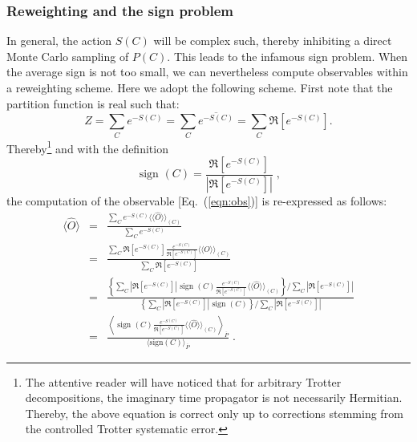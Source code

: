 \subsubsection{Reweighting and the sign problem}\label{sec:reweight}

In general, the action  $S(C) $ will be complex such, thereby inhibiting a direct Monte Carlo sampling of $P(C)$.   This leads to the infamous sign problem.  When the average sign is not too small, we can nevertheless  compute observables within a reweighting scheme.   Here we adopt the following scheme. First  note  that the partition function is real such that: 
\begin{equation}
	Z =   \sum_{C}  e^{-S(C)}    =  \sum_{C}  \overline{e^{-S(C)}} = \sum_{C}  \Re \left[e^{-S(C)} \right]. 
\end{equation}
Thereby\footnote{The attentive reader will have noticed that   for arbitrary Trotter decompositions,  the  imaginary time propagator is not necessarily Hermitian. Thereby, the above equation is correct only up to corrections stemming from the  controlled Trotter systematic error. }
and with the definition
\begin{equation}
\label{Sign.eq}
	 \text{ sign }(C)   =  \frac{   \Re \left[e^{-S(C)} \right]  } {\left| \Re \left[e^{-S(C)} \right]  \right|  }\;,
\end{equation}
the computation of the observable [Eq.~(\ref{eqn:obs})] is re-expressed as follows:
\begin{eqnarray}\label{eqn:obs_rw}
\langle \hat{O}  \rangle  &=&  \frac{\sum_{C}  e^{-S(C)} \langle \langle \hat{O}  \rangle \rangle_{(C)} }{\sum_{C}  e^{-S(C)}}       \nonumber \\ 
                          &=&  \frac{\sum_{C}   \Re \left[e^{-S(C)} \right]    \frac{e^{-S(C)}} {\Re \left[e^{-S(C)} \right]}  \langle \langle \hat{O}  \rangle \rangle_{(C)} }{\sum_{C}   \Re \left[e^{-S(C)} \right]}    \nonumber \\ 
          &=&
   \frac{
     \left\{
      \sum_{C}  \left| \Re \left[e^{-S(C)} \right]  \right|   \text{ sign }(C)   \frac{e^{-S(C)}} {\Re \left[e^{-S(C)} \right]}  \langle \langle \hat{O}  \rangle \rangle_{(C)}  \right\}/
            \sum_{C}  \left| \Re \left[ e^{-S(C)} \right] \right|  
          }  
          { 
          \left\{ \sum_{C}  \left|  \Re \left[ e^{-S(C)} \right]   \right|   \text{ sign }(C) \right\}/
            \sum_{C}   \left| \Re \left[ e^{-S(C)} \right] \right|  
          } \nonumber\\
          &=&
  	 \frac{  \left\langle  \text{ sign }(C)   \frac{e^{-S(C)}} {\Re \left[e^{-S(C)} \right]}  \langle \langle \hat{O}  \rangle \rangle_{(C)}  \right\rangle_{\overline{P}} } { \langle \text{sign} (C)   \rangle_{\overline{P}}}  \;.      
\end{eqnarray} 
